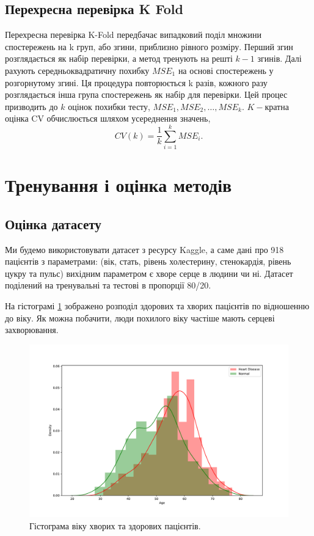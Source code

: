 \documentclass[14pt,a4paper]{extarticle}
\newcounter{e}
\numberwithin{equation}{section}
\numberwithin{figure}{section}
\begin{document}
	\subsection{Перехресна перевірка K Fold}

    Перехресна перевірка K-Fold передбачає випадковий поділ множини спостережень на k груп, або згини, приблизно рівного розміру. Перший згин розглядається як набір перевірки, а метод тренують на решті $k-1$ згинів. Далі рахують середньоквадратичну похибку $MSE_{1}$ на основі спостережень у розгорнутому згині. Ця процедура повторюється k разів, кожного разу розглядається інша група спостережень як набір для перевірки. Цей процес призводить до $k$ оцінок похибки тесту, $MSE_{1}, MSE_{2}, \dots, MSE_{k}$. $K-$кратна оцінка CV обчислюється шляхом усереднення значень,
    $$
    CV(k) = \frac{1}{k} \sum_{i=1}^{k} MSE_{i}.
    $$

    \newpage
    \thispagestyle{empty}
    \section{Тренування і оцінка методів}
    
    \subsection{Оцінка датасету}
   Ми будемо використовувати датасет з ресурсу Kaggle, а саме дані про 918 пацієнтів з параметрами: (вік, стать, рівень холестерину, стенокардія, рівень цукру та пульс) вихідним параметром є хворе серце в людини чи ні. Датасет поділений на тренувальні та тестові в пропорції 80/20. 

	На гістограмі \ref{fig:age-distribution} зображено розподіл здорових та хворих пацієнтів по відношенню до віку. Як можна побачити, люди похилого віку частіше мають серцеві захворювання.
	
	\begin{figure}[h!]
		\centering
		\includegraphics[width=1.1 \textwidth]{images/age_distribution.pdf}
		\caption{Гістограма віку хворих та здорових пацієнтів.}
		\label{fig:age-distribution}
	\end{figure}
	
\end{document}

